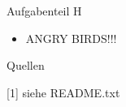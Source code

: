 \documentclass{beamer}
\begin{document}
\begin{frame}{Aufgabenteil H}
\begin{itemize}
\item ANGRY BIRDS!!!
\end{itemize}
\begin{figure}
    \centering
\end{figure}
\end{frame}



\begin{frame}{Quellen}
	\begin{thebibliography}{1}
[1]{ siehe README.txt}
\end{thebibliography}
\end{frame}


	
    	
    	
    	
\end{document}
